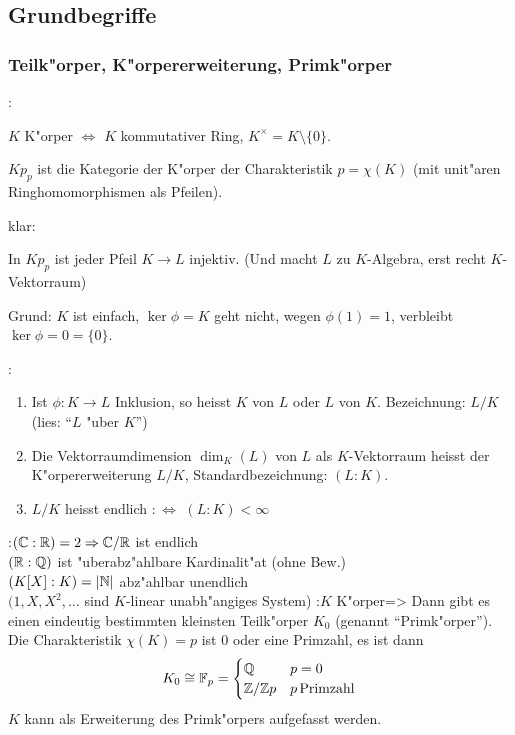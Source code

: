 \subsection{Grundbegriffe}
\subsubsection{Teilk"orper, K"orpererweiterung, Primk"orper}
\remind{}:{
$K$ K"orper $\iff$ $K$ kommutativer Ring, $K^{\times}=K\setminus\{0\}$.

${Kp}_p$ ist die Kategorie der K"orper der Charakteristik $p=\chi(K)$
(mit unit"aren Ringhomomorphismen als Pfeilen).

klar:

In ${Kp}_p$ ist jeder Pfeil $K\longrightarrow L$ injektiv. (Und macht
$L$ zu $K$-Algebra, erst recht $K$-Vektorraum)

Grund: $K$ ist einfach, $\ker \phi=K$ geht nicht, wegen $\phi(1)=1$, verbleibt $\ker \phi=0=\{0\}$. 
}
\names{}:{
 \begin{enumerate}
 \item Ist $\phi: K \longrightarrow L$ Inklusion, so heisst $K$  von $L$
 oder $L$  von $K$.
 Bezeichnung: $L/K$ (lies: ``$L$ "uber $K$'')
 \item Die Vektorraumdimension $\operatorname{dim}_K(L)$ von $L$ als $K$-Vektorraum 
 heisst  der K"orpererweiterung $L/K$, Standardbezeichnung: $(L:K)$.
 \item $L/K$ heisst endlich $:\iff$ $(L:K)<\infty$
 \end{enumerate}
 }
\example{}:{$(\mathbb C:\mathbb R)=2 \Rightarrow \mathbb C/\mathbb R$ ist endlich\\
 $(\mathbb R:\mathbb Q)$ ist "uberabz"ahlbare Kardinalit"at (ohne Bew.)\\
 $(K[X]:K)=|\mathbb N|$ abz"ahlbar unendlich\\
 $(1,X,X^2,\ldots$ sind $K$-linear unabh"angiges System)}
\theorem{}:{$K$ K"orper}=>{
 \label{the:identifiziere-primkoerper}
 Dann gibt es einen eindeutig bestimmten kleinsten 
 Teilk"orper $K_0$ (genannt ``Primk"orper''). Die Charakteristik $\chi(K)=p$ ist $0$
 oder eine Primzahl, es ist dann
 \[K_0 \cong \mathbb{F}_p=\begin{cases}
                         \mathbb Q & p=0\\
						 \mathbb Z/\mathbb Z p & p \operatorname{Primzahl}\\
						 \end{cases} \]
 $K$ kann als Erweiterung des Primk"orpers aufgefasst werden.}
